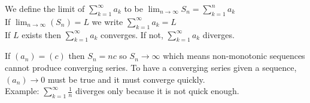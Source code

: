 \documentclass{article}
\begin{document}
We define the limit of $\sum_{k=1}^{\infty}a_k$ to be $\lim_{n \to \infty}S_n = \sum_{k=1}^{n}a_k$\\
If $\lim_{n \to \infty}(S_n) = L$ we write $\sum_{k=1}^{\infty}a_k = L$\\
If $L$ exists then $\sum_{k=1}^{\infty} a_k$ converges. If not, $\sum_{k=1}^{\infty}a_k$ diverges.

If $(a_n) = (c)$ then $S_n = nc$ so $S_n \to \infty$ which means non-monotonic sequences cannot produce converging series. To have a converging series given a sequence, $(a_n) \to 0$ must be true and it must converge quickly.\\
Example: $\sum_{k=1}^{\infty}\frac{1}{n}$ diverges only because it is not quick enough.
\end{document}
